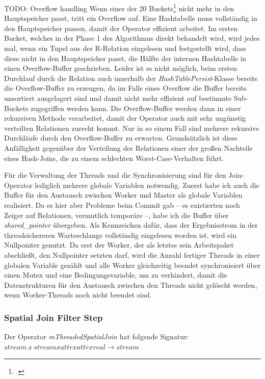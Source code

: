 \documentclass[a4paper,12pt,twoside]{article}
\newcommand{\Fb}[1]{\textit{#1}} %
\begin{document}
TODO: Overflow handling
Wenn einer der 20 Buckets\footcite{also die der ersten Aufteilung in den Worker-Threads} nicht mehr in den Hauptspeicher passt, tritt ein Overflow auf. Eine Hashtabelle muss vollständig in den Hauptspeicher passen, damit der Operator effizient arbeitet. Im ersten Bucket, welches in der Phase 1 des Algorithmus direkt behandelt wird, wird jedes mal, wenn ein Tupel aus der R-Relation eingelesen und festgestellt wird, dass diese nicht in den Hauptspeicher passt, die Hälfte der internen Hashtabelle in einen Overflow-Buffer geschrieben. Leider ist es nicht möglich, beim ersten Durchlauf durch die Relation auch innerhalb der \Fb{HashTablePersist}-Klasse bereits die Overflow-Buffer zu erzeugen, da im Falle eines Overflow die Buffer bereits unsortiert ausgelagert sind und damit nicht mehr effizient auf bestimmte Sub-Buckets zugegriffen werden kann. Die Overflow-Buffer werden dann in einer rekursiven Methode verarbeitet, damit der Operator auch mit sehr ungünstig verteilten Relationen zurecht kommt. Nur in so einem Fall sind mehrere rekursive Durchläufe durch den Overflow-Buffer zu erwarten. Grundsätzlich ist diese Anfälligkeit gegenüber der Verteilung der Relationen einer der großen Nachteile eines Hash-Joins, die zu einem schlechten Worst-Case-Verhalten führt.

Für die Verwaltung der Threads und die Synchronisierung sind für den Join-Operator lediglich mehrere globale Variablen notwendig. Zuerst habe ich auch die Buffer für den Austausch zwischen Worker und Master als globale Variablen realisiert. Da es hier aber Probleme beim Commit gab -- es existierten noch Zeiger auf Relationen, vermutlich temporäre --, habe ich die Buffer über \Fb{shared\_pointer} übergeben. Als Kennzeichen dafür, dass der Ergebnisstrom in der threadsichereren Warteschlange vollständig eingelesen worden ist, wird ein Nullpointer genutzt. Da erst der Worker, der als letztes sein Arbeitspaket abschließt, den Nullpointer setzten darf, wird die Anzahl fertiger Threads in einer globalen Variable gezählt und alle Worker gleichzeitig beendet synchronisiert über einen Mutex und eine Bedingungsvariable, um zu verhindert, damit die Datenstrukturen für den Austausch zwischen den Threads nicht gelöscht werden, wenn Worker-Threads noch nicht beendet sind.
 
\subsubsection{Spatial Join Filter Step}

Der Operator \Fb{mThreadedSpatialJoin} hat folgende Signatur: \newline
$stream~x~stream x attr x attr x real \longrightarrow stream$
\end{document}
